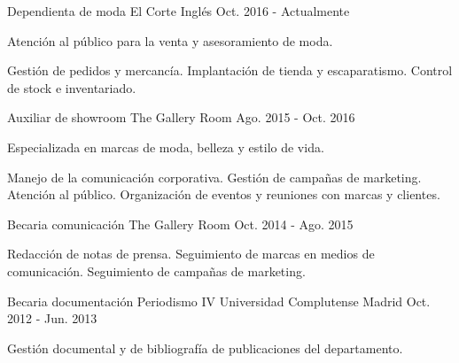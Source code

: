 

\begin{cventries}

  \cventry
    {Dependienta de moda} %
    {El Corte Inglés} %
    {} %
    {Oct. 2016 - Actualmente} %
    {
      \begin{cvitems} %
        \item {Atención al público para la venta y asesoramiento de moda.}
        \item {Gestión de pedidos y mercancía. Implantación de tienda y escaparatismo. Control de stock e inventariado.}
      \end{cvitems}
    }

  \cventry
    {Auxiliar de showroom} %
    {The Gallery Room} %
    {} %
    {Ago. 2015 - Oct. 2016} %
    {
      \begin{cvitems} %
        \item {Especializada en marcas de moda, belleza y estilo de vida.}
        \item {Manejo de la comunicación corporativa. Gestión de campañas de marketing. Atención al público. Organización de eventos y reuniones con marcas y clientes.}
      \end{cvitems}
    }

  \cventry
    {Becaria comunicación} %
    {The Gallery Room} %
    {} %
    {Oct. 2014 - Ago. 2015} %
    {
      \begin{cvitems} %
        \item {Redacción de notas de prensa. Seguimiento de marcas en medios de comunicación. Seguimiento de campañas de marketing.}
      \end{cvitems}
    }

  \cventry
    {Becaria documentación Periodismo IV} %
    {Universidad Complutense Madrid} %
    {} %
    {Oct. 2012 - Jun. 2013} %
    {
      \begin{cvitems} %
        \item {Gestión documental y de bibliografía de publicaciones del departamento.}
      \end{cvitems}
    }


\end{cventries}
